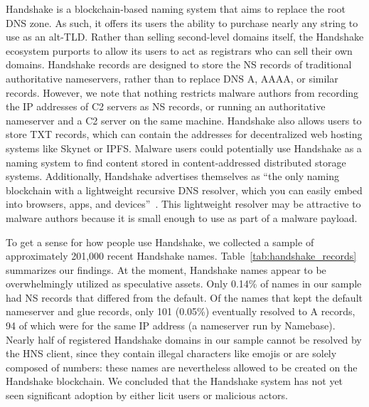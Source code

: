 Handshake is a blockchain-based naming system that aims to replace the root DNS 
zone. As such, it offers its users the ability to purchase nearly any string to 
use as an alt-TLD. Rather than selling second-level domains 
itself, the Handshake ecosystem purports to allow its users 
to act as registrars who can sell their own domains. 
Handshake records are designed to store the NS records of traditional 
authoritative nameservers, rather than to replace DNS A, AAAA, or similar 
records. However, we note that nothing restricts malware authors from recording 
the IP addresses of C2 servers as NS records, or running an authoritative 
nameserver and a C2 server on the same machine. Handshake also allows users to 
store TXT records, which can contain the addresses for decentralized web 
hosting systems like Skynet or IPFS. Malware users could potentially use 
Handshake as a naming system to find content stored in 
content-addressed distributed storage systems. Additionally, Handshake 
advertises themselves as ``the only naming blockchain with a lightweight 
recursive DNS resolver, which you can easily embed into 
browsers, apps, and devices''~\cite{namebase_access_handshake}. 
This lightweight resolver may be attractive to malware authors because it is 
small enough to use as part of a malware payload.


To get a sense for how people use Handshake, we collected a 
sample of approximately 201,000 recent Handshake names.
Table~\ref{tab:handshake_records} 
summarizes our findings. At the moment, Handshake names appear to be 
overwhelmingly utilized as speculative assets. Only 0.14\% of 
names in our sample had NS records that differed from the 
default. Of the names that kept the default nameserver and 
glue records, only 101 (0.05\%) eventually resolved to A records, 94 of 
which were for the same IP address (a nameserver run by Namebase). Nearly half 
of registered Handshake domains in our sample cannot be 
resolved by the HNS client, since they contain illegal characters like emojis 
or are solely composed of numbers: these names are nevertheless allowed to be 
created on the Handshake blockchain. We concluded that the Handshake system has 
not yet seen significant adoption by either licit users or malicious 
actors.

